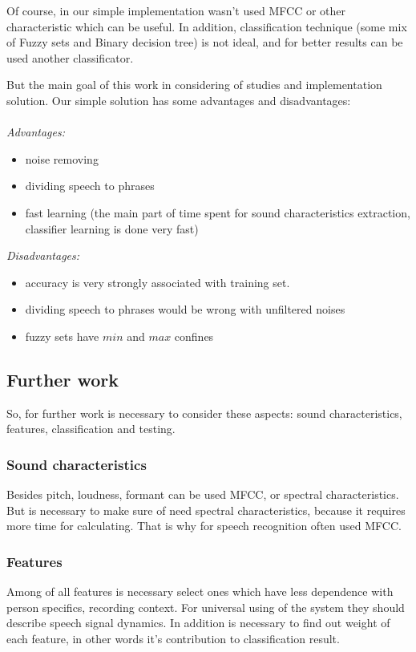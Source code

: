 \documentclass[12pt, letterpaper]{article}
\begin{document}
Of course, in our simple implementation wasn't used MFCC or other characteristic which can be useful. In addition, classification technique (some mix of Fuzzy sets and Binary decision tree) is not ideal, and for better results can be used another classificator.

But the main goal of this work in considering of studies and implementation solution. Our simple solution has some advantages and disadvantages:\\\\
\textit{Advantages:}
\begin{itemize}
	\item noise removing
	\item dividing speech to phrases
	\item fast learning (the main part of time spent for sound characteristics extraction, classifier learning is done very fast)
\end{itemize}
\textit{Disadvantages:}
\begin{itemize}
	\item accuracy is very strongly associated with training set. 
	\item dividing speech to phrases would be wrong with unfiltered noises
	\item fuzzy sets have $min$ and $max$ confines
\end{itemize}

\subsection{Further work}
So, for further work is necessary to consider these aspects: sound characteristics, features, classification and testing.

\subsubsection{Sound characteristics}
Besides pitch, loudness, formant can be used MFCC, or spectral characteristics. But is necessary to  make sure of need spectral characteristics, because it requires more time for calculating. That is why for speech recognition often used MFCC.

\subsubsection{Features}
Among of all features is necessary select ones which have less dependence with person specifics, recording context. For universal using of the system they should describe speech signal dynamics. In addition is necessary to find out weight of each feature, in other words it's contribution to classification result.
\end{document}
